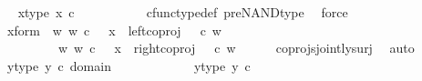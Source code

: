 \begin{isabellebody}
\ \isamarkupfalse%
\ x{\isacharunderscore}{\kern0pt}type{\isacharprime}{\kern0pt}{\isacharcolon}{\kern0pt}\ {\isachardoublequoteopen}x\ {\isasymin}\isactrlsub c\ {\isasymone}\ {\isasymCoprod}\ {\isacharparenleft}{\kern0pt}{\isasymone}{\isasymCoprod}{\isasymone}{\isacharparenright}{\kern0pt}{\isachardoublequoteclose}\ \ \isanewline
\ \ \ \ \isamarkupfalse%
\ cfunc{\isacharunderscore}{\kern0pt}type{\isacharunderscore}{\kern0pt}def\ pre{\isacharunderscore}{\kern0pt}NAND{\isacharunderscore}{\kern0pt}type\ \isamarkupfalse%
\ force\isanewline
\ \ \isamarkupfalse%
\ \isamarkupfalse%
\ x{\isacharunderscore}{\kern0pt}form{\isacharcolon}{\kern0pt}\ {\isachardoublequoteopen}{\isacharparenleft}{\kern0pt}{\isasymexists}\ w{\isachardot}{\kern0pt}\ w\ {\isasymin}\isactrlsub c\ {\isasymone}\ {\isasymand}\ x\ {\isacharequal}{\kern0pt}\ left{\isacharunderscore}{\kern0pt}coproj\ {\isasymone}\ {\isacharparenleft}{\kern0pt}{\isasymone}{\isasymCoprod}{\isasymone}{\isacharparenright}{\kern0pt}\ {\isasymcirc}\isactrlsub c\ w{\isacharparenright}{\kern0pt}\isanewline
\ \ \ \ \ \ {\isasymor}\ \ {\isacharparenleft}{\kern0pt}{\isasymexists}\ w{\isachardot}{\kern0pt}\ w\ {\isasymin}\isactrlsub c\ {\isasymone}{\isasymCoprod}{\isasymone}\ {\isasymand}\ x\ {\isacharequal}{\kern0pt}\ right{\isacharunderscore}{\kern0pt}coproj\ {\isasymone}\ {\isacharparenleft}{\kern0pt}{\isasymone}{\isasymCoprod}{\isasymone}{\isacharparenright}{\kern0pt}\ {\isasymcirc}\isactrlsub c\ w{\isacharparenright}{\kern0pt}{\isachardoublequoteclose}\isanewline
\ \ \ \ \isamarkupfalse%
\ coprojs{\isacharunderscore}{\kern0pt}jointly{\isacharunderscore}{\kern0pt}surj\ \isamarkupfalse%
\ auto\isanewline
\isanewline
\ \ \isamarkupfalse%
\ y{\isacharunderscore}{\kern0pt}type{\isacharcolon}{\kern0pt}\ {\isachardoublequoteopen}y\ {\isasymin}\isactrlsub c\ domain\ {\isacharparenleft}{\kern0pt}{\isasymlangle}{\isasymf}{\isacharcomma}{\kern0pt}\ {\isasymf}{\isasymrangle}\ {\isasymamalg}\ {\isasymlangle}{\isasymt}{\isacharcomma}{\kern0pt}{\isasymf}{\isasymrangle}\ {\isasymamalg}\ {\isasymlangle}{\isasymf}{\isacharcomma}{\kern0pt}{\isasymt}{\isasymrangle}{\isacharparenright}{\kern0pt}{\isachardoublequoteclose}\ \isanewline
\ \ \isamarkupfalse%
\ \isamarkupfalse%
\ y{\isacharunderscore}{\kern0pt}type{\isacharprime}{\kern0pt}{\isacharcolon}{\kern0pt}\ {\isachardoublequoteopen}y\ {\isasymin}\isactrlsub c\ {\isasymone}{\isasymCoprod}\ {\isacharparenleft}{\kern0pt}{\isasymone}{\isasymCoprod}{\isasymone}{\isacharparenright}{\kern0pt}{\isachardoublequoteclose}\ \ \isanewline

\end{isabellebody}
